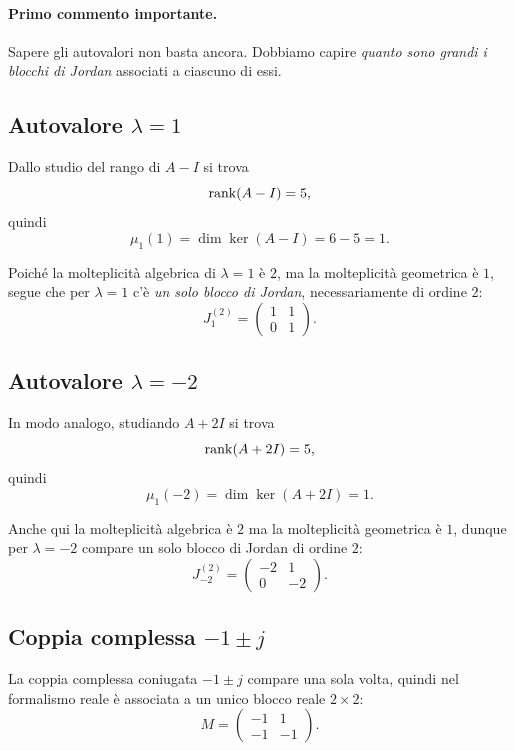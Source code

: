 \paragraph{Primo commento importante.}
Sapere gli autovalori non basta ancora.  
Dobbiamo capire \emph{quanto sono grandi i blocchi di Jordan} associati a ciascuno di essi.

\subsection{Autovalore \texorpdfstring{$\lambda=1$}{lambda=1}}

Dallo studio del rango di $A-I$ si trova
\[
\rank(A-I)=5,
\]
quindi
\[
\mu_1(1)=\dim\ker(A-I)=6-5=1.
\]

Poiché la molteplicità algebrica di $\lambda=1$ è $2$, ma la molteplicità geometrica è $1$, segue che per $\lambda=1$ c'è \emph{un solo blocco di Jordan}, necessariamente di ordine $2$:
\[
J^{(2)}_{1}=
\begin{pmatrix}
1 & 1\\
0 & 1
\end{pmatrix}.
\]

\subsection{Autovalore \texorpdfstring{$\lambda=-2$}{lambda=-2}}

In modo analogo, studiando $A+2I$ si trova
\[
\rank(A+2I)=5,
\]
quindi
\[
\mu_1(-2)=\dim\ker(A+2I)=1.
\]

Anche qui la molteplicità algebrica è $2$ ma la molteplicità geometrica è $1$, dunque per $\lambda=-2$ compare un solo blocco di Jordan di ordine $2$:
\[
J^{(2)}_{-2}=
\begin{pmatrix}
-2 & 1\\
0 & -2
\end{pmatrix}.
\]

\subsection{Coppia complessa \texorpdfstring{$-1\pm j$}{-1 +- j}}

La coppia complessa coniugata $-1\pm j$ compare una sola volta, quindi nel formalismo reale è associata a un unico blocco reale $2\times 2$:
\[
M=
\begin{pmatrix}
-1 & 1\\
-1 & -1
\end{pmatrix}.
\]

